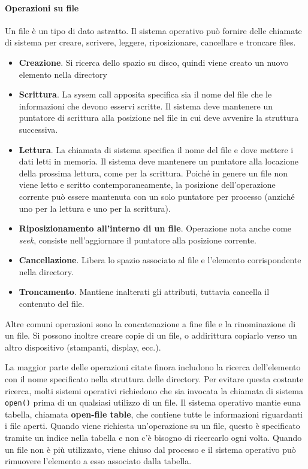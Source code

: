 \documentclass[a4paper]{article}
\begin{document}
\paragraph{Operazioni su file}
Un file è un tipo di dato astratto. Il sistema operativo può fornire delle chiamate di sistema per creare, scrivere, leggere, riposizionare, cancellare e troncare files.
\begin{itemize}
   \item \textbf{Creazione}. Si ricerca dello spazio su disco, quindi viene creato un nuovo elemento nella directory
   \item \textbf{Scrittura}. La sysem call apposita specifica sia il nome del file che le informazioni che devono esservi scritte. Il sistema deve mantenere un puntatore di scrittura alla posizione nel file in cui deve avvenire la struttura successiva.
   \item \textbf{Lettura}. La chiamata di sistema specifica il nome del file e dove mettere i dati letti in memoria. Il sistema deve mantenere un puntatore alla locazione della prossima lettura, come per la scrittura. Poiché in genere un file non viene letto e scritto contemporaneamente, la posizione dell'operazione corrente può essere mantenuta con un solo puntatore per processo (anziché uno per la lettura e uno per la scrittura).
   \item \textbf{Riposizionamento all'interno di un file}. Operazione nota anche come \textit{seek}, consiste nell'aggiornare il puntatore alla posizione corrente.
   \item \textbf{Cancellazione}. Libera lo spazio associato al file e l'elemento corrispondente nella directory.
   \item \textbf{Troncamento}. Mantiene inalterati gli attributi, tuttavia cancella il contenuto del file.
\end{itemize}

Altre comuni operazioni sono la concatenazione a fine file e la rinominazione di un file. Si possono inoltre creare copie di un file, o addirittura copiarlo verso un altro dispositivo (stampanti, display, ecc.).

La maggior parte delle operazioni citate finora includono la ricerca dell'elemento con il nome specificato nella struttura delle directory. Per evitare questa costante ricerca, molti sistemi operativi richiedono che sia invocata la chiamata di sistema \texttt{open()} prima di un qualsiasi utilizzo di un file. Il sistema operativo mantie euna tabella, chiamata \textbf{open-file table}, che contiene tutte le informazioni riguardanti i file aperti. Quando viene richiesta un'operazione su un file, questo è specificato tramite un indice nella tabella e non c'è bisogno di ricercarlo ogni volta. Quando un file non è più utilizzato, viene chiuso dal processo e il sistema operativo può rimuovere l'elemento a esso associato dalla tabella.
\end{document}
